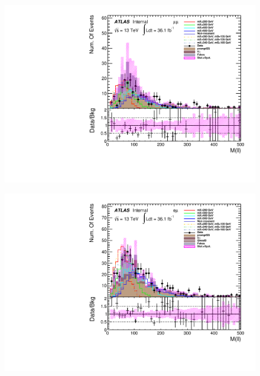 \begin{figure}[h]
\begin{minipage}[t]{0.33\linewidth}
 \label{fig:dataMC_high_Njet_CR:m_ll_ee.pdf}
 \end{minipage}
 \begin{minipage}[t]{0.33\linewidth}
 \centering
 \includegraphics[width=1.0\textwidth]{fig/dataMC_high_Njet_CR/m_ll_mumu.pdf}
 \label{fig:dataMC_high_Njet_CR:m_ll_mumu.pdf}
 \end{minipage}
 \begin{minipage}[t]{0.33\linewidth}
 \centering
 \includegraphics[width=1.0\textwidth]{fig/dataMC_high_Njet_CR/m_ll_emu.pdf}
 \label{fig:dataMC_high_Njet_CR:m_ll_emu.pdf}
 \end{minipage}
\begin{minipage}[t]{0.33\linewidth}
 \centering

\end{minipage}
\end{figure}
